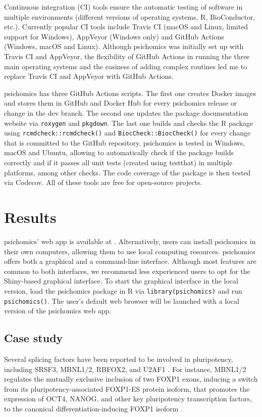 Continuous integration (CI) tools ensure the automatic testing of software in multiple environments (different versions of operating systems, R, BioConductor, etc.). Currently popular CI tools include Travis CI (macOS and Linux, limited support for Windows), AppVeyor (Windows only) and GitHub Actions (Windows, macOS and Linux). Although psichomics was initially set up with Travis CI and AppVeyor, the flexibility of GitHub Actions in running the three main operating systems and the easiness of adding complex routines led me to replace Travis CI and AppVeyor with GitHub Actions.

psichomics has three GitHub Actions scripts. The first one creates Docker images and stores them in GitHub and Docker Hub for every psichomics release or change in the dev branch. The second one updates the package documentation website via \texttt{roxygen} and \texttt{pkgdown}. The last one builds and checks the R package using \texttt{rcmdcheck::rcmdcheck()} and \texttt{BiocCheck::BiocCheck()} for every change that is committed to the GitHub repository. psichomics is tested in Windows, macOS and Ubuntu, allowing to automatically check if the package builds correctly and if it passes all unit tests (created using testthat) in multiple platforms, among other checks. The code coverage of the package is then tested via Codecov. All of these tools are free for open-source projects.

\section{Results}

psichomics' web app is available at . Alternatively, users can install psichomics in their own computers, allowing them to use local computing resources. psichomics offers both a graphical and a command-line interface. Although most features are common to both interfaces, we recommend less experienced users to opt for the Shiny-based graphical interface. To start the graphical interface in the local version, load the psichomics package in R via \texttt{library(psichomics)} and run \texttt{psichomics()}. The user's default web browser will be launched with a local version of the psichomics web app.

\subsection{Case study}

Several splicing factors have been reported to be involved in pluripotency, including SRSF3, MBNL1/2, RBFOX2, and U2AF1 \cite{zavolan:2018vi,han:2013ww,venables:2013tz,chen:2015wm}. For instance, MBNL1/2 regulates the mutually exclusive inclusion of two FOXP1 exons, inducing a switch from its pluripotency-associated FOXP1-ES protein isoform, that promotes the expression of OCT4, NANOG, and other key pluripotency transcription factors, to the canonical differentiation-inducing FOXP1 isoform \cite{gabut:2011wk}.


